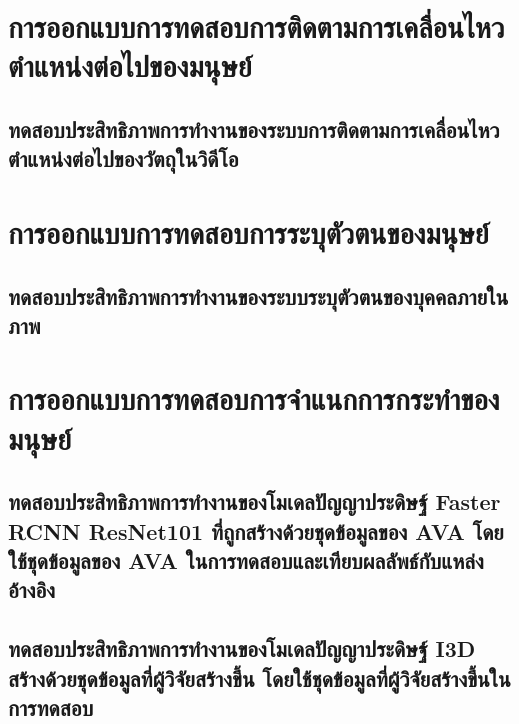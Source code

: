 \section{การออกแบบการทดสอบการติดตามการเคลื่อนไหวตำแหน่งต่อไปของมนุษย์}
\subsection{ทดสอบประสิทธิภาพการทำงานของระบบการติดตามการเคลื่อนไหวตำแหน่งต่อไปของวัตถุในวิดีโอ}

\clearpage

\section{การออกแบบการทดสอบการระบุตัวตนของมนุษย์}
\subsection{ทดสอบประสิทธิภาพการทำงานของระบบระบุตัวตนของบุคคลภายในภาพ}

\clearpage

\section{การออกแบบการทดสอบการจำแนกการกระทำของมนุษย์}
\subsection{ทดสอบประสิทธิภาพการทำงานของโมเดลปัญญาประดิษฐ์ Faster RCNN ResNet101 ที่ถูกสร้างด้วยชุดข้อมูลของ AVA โดยใช้ชุดข้อมูลของ AVA ในการทดสอบและเทียบผลลัพธ์กับแหล่งอ้างอิง}

\clearpage
\subsection{ทดสอบประสิทธิภาพการทำงานของโมเดลปัญญาประดิษฐ์ I3D สร้างด้วยชุดข้อมูลที่ผู้วิจัยสร้างขึ้น โดยใช้ชุดข้อมูลที่ผู้วิจัยสร้างขึ้นในการทดสอบ}
